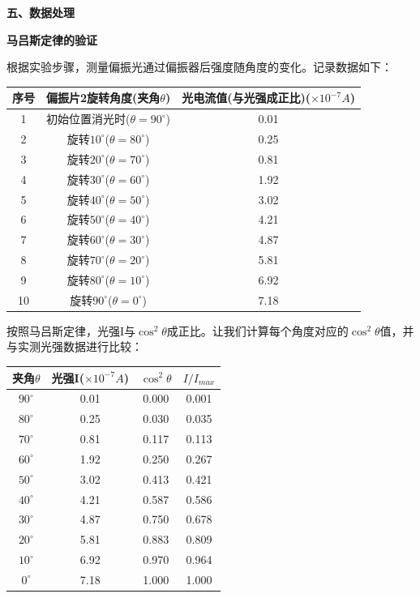 ﻿\documentclass[12pt,a4paper]{article}
\begin{document}
\vspace{0.5cm}
\textbf{五、数据处理}

\textbf{马吕斯定律的验证}

根据实验步骤，测量偏振光通过偏振器后强度随角度的变化。记录数据如下：
\begin{center}
    \begin{tabular}{ccc}
        \toprule
        序号 & 偏振片2旋转角度(夹角$\theta$) & 光电流值(与光强成正比)($\times 10^{-7}A$)\\
        \midrule
        1 & 初始位置消光时($\theta = 90^\circ$) & 0.01 \\
        2 & 旋转$10^\circ$($\theta = 80^\circ$) & 0.25 \\
        3 & 旋转$20^\circ$($\theta = 70^\circ$) & 0.81 \\
        4 & 旋转$30^\circ$($\theta = 60^\circ$) & 1.92 \\
        5 & 旋转$40^\circ$($\theta = 50^\circ$) & 3.02 \\
        6 & 旋转$50^\circ$($\theta = 40^\circ$) & 4.21 \\
        7 & 旋转$60^\circ$($\theta = 30^\circ$) & 4.87 \\
        8 & 旋转$70^\circ$($\theta = 20^\circ$) & 5.81 \\
        9 & 旋转$80^\circ$($\theta = 10^\circ$) & 6.92 \\
        10 & 旋转$90^\circ$($\theta = 0^\circ$) & 7.18 \\
        \bottomrule
    \end{tabular}
\end{center}

按照马吕斯定律，光强I与$\cos^2\theta$成正比。让我们计算每个角度对应的$\cos^2\theta$值，并与实测光强数据进行比较：

\begin{center}
    \begin{tabular}{cccc}
        \toprule
        夹角$\theta$ & 光强I($\times 10^{-7}A$) & $\cos^2\theta$ & $I/I_{max}$ \\
        \midrule
        $90^\circ$ & 0.01 & 0.000 & 0.001 \\
        $80^\circ$ & 0.25 & 0.030 & 0.035 \\
        $70^\circ$ & 0.81 & 0.117 & 0.113 \\
        $60^\circ$ & 1.92 & 0.250 & 0.267 \\
        $50^\circ$ & 3.02 & 0.413 & 0.421 \\
        $40^\circ$ & 4.21 & 0.587 & 0.586 \\
        $30^\circ$ & 4.87 & 0.750 & 0.678 \\
        $20^\circ$ & 5.81 & 0.883 & 0.809 \\
        $10^\circ$ & 6.92 & 0.970 & 0.964 \\
        $0^\circ$ & 7.18 & 1.000 & 1.000 \\
        \bottomrule
    \end{tabular}
\end{center}
\end{document}
